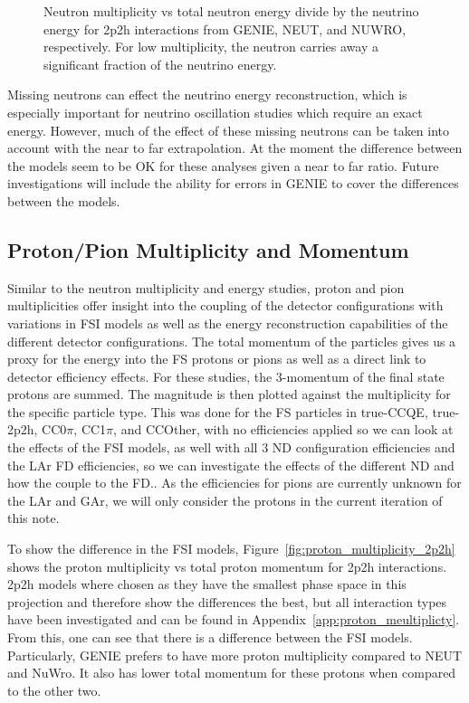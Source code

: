 \documentclass[12pt]{article}
\begin{document}
\begin{figure}
\begin{subfigure}[b]{0.32\textwidth}
\end{subfigure}
\caption{Neutron multiplicity vs total neutron energy divide by the neutrino energy for 2p2h interactions from GENIE, NEUT, and NUWRO, respectively.  For low multiplicity, the neutron carries away a significant fraction of the neutrino energy.} 
\label{fig:Neutron_multi_ene_enu_2p2h_ND}
\end{figure}
\FloatBarrier

Missing neutrons can effect the neutrino energy reconstruction, which is especially important for neutrino oscillation studies which require an exact energy.
However, much of the effect of these missing neutrons can be taken into account with the near to far extrapolation.
At the moment the difference between the models seem to be OK for these analyses given a near to far ratio.
Future investigations will include the ability for errors in GENIE to cover the differences between the models. 

\subsection{Proton/Pion Multiplicity and Momentum}
\label{subsec:Particle_multiplicities_momentum}

Similar to the neutron multiplicity and energy studies, proton and pion multiplicities offer insight into the coupling of the detector configurations with variations in FSI models as well as the energy reconstruction capabilities of the different detector configurations. 
The total momentum of the particles gives us a proxy for the energy into the FS protons or pions as well as a direct link to detector efficiency effects.  
For these studies, the 3-momentum of the final state protons are summed. 
The magnitude is then plotted against the multiplicity for the specific particle type. 
This was done for the FS particles in true-CCQE, true-2p2h, CC0$\pi$, CC1$\pi$, and CCOther, with no efficiencies applied so we can look at the effects of the FSI models, as well with all 3 ND configuration efficiencies and the LAr FD efficiencies, so we can investigate the effects of the different ND and how the couple to the FD.. 
As the efficiencies for pions are currently unknown for the LAr and GAr, we will only consider the protons in the current iteration of this note. 

To show the difference in the FSI models, Figure~\ref{fig:proton_multiplicity_2p2h} shows the proton multiplicity vs total proton momentum for 2p2h interactions. 
2p2h models where chosen as they have the smallest phase space in this projection and therefore show the differences the best, but all interaction types have been investigated and can be found in Appendix~\ref{app:proton_meultiplicty}.
From this, one can see that there is a difference between the FSI models.  
Particularly, GENIE prefers to have more proton multiplicity compared to NEUT and NuWro.
It also has lower total momentum for these protons when compared to the other two.
 
\end{document}
